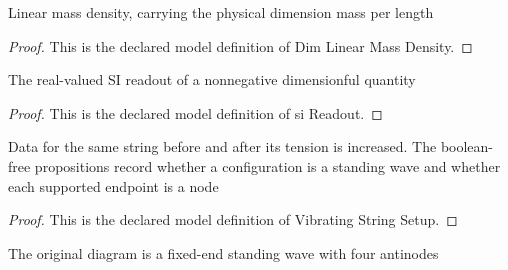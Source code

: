 \begin{definition}
  \label{def:physics:phyx-mini-0178:phyxminiproblems-problemphyxmini0178-dimlinearmassdensity}
  Linear mass density, carrying the physical dimension mass per length
\end{definition}
\begin{proof}
  This is the declared model definition of Dim Linear Mass Density.
\end{proof}
\begin{definition}[si Readout]
  \label{def:physics:phyx-mini-0178:phyxminiproblems-problemphyxmini0178-sireadout}
  The real-valued SI readout of a nonnegative dimensionful quantity
\end{definition}
\begin{proof}
  This is the declared model definition of si Readout.
\end{proof}
\begin{definition}
  \label{def:physics:phyx-mini-0178:phyxminiproblems-problemphyxmini0178-vibratingstringsetup}
  Data for the same string before and after its tension is increased. The boolean-free propositions record whether a configuration is a standing wave and whether each supported endpoint is a node
\end{definition}
\begin{proof}
  This is the declared model definition of Vibrating String Setup.
\end{proof}
\begin{definition}
  \label{def:physics:phyx-mini-0178:phyxminiproblems-problemphyxmini0178-matchesinitialfigure}
  The original diagram is a fixed-end standing wave with four antinodes
\end{definition}
